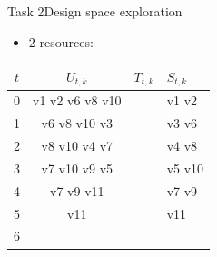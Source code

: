 {\begin{frame}{Task 2}{Design space exploration}
  \begin{solutionnoinc}
    \begin{itemize}
      \item $2$ resources:
    \end{itemize}
    \centering
    \tiny
    \begin{tabular}{c|c|l|l|}
    \hline$t$ & $U_{t, k}$ & $T_{t, k}$ & $S_{t, k}$ \\
    \hline 0 & v1 v2 v6 v8 v10 & & v1 v2 \\
    \hline 1 & v6 v8 v10 v3 & & v3 v6\\
    \hline 2 & v8 v10 v4 v7 & & v4 v8 \\
    \hline 3 & v7 v10 v9 v5 & & v5 v10 \\
    \hline 4 & v7 v9 v11 & & v7 v9 \\
    \hline 5 & v11 & & v11 \\
    \hline 6 &  & & \\
    \hline
    \end{tabular}
  \end{solutionnoinc}
\end{frame}
}\fi

